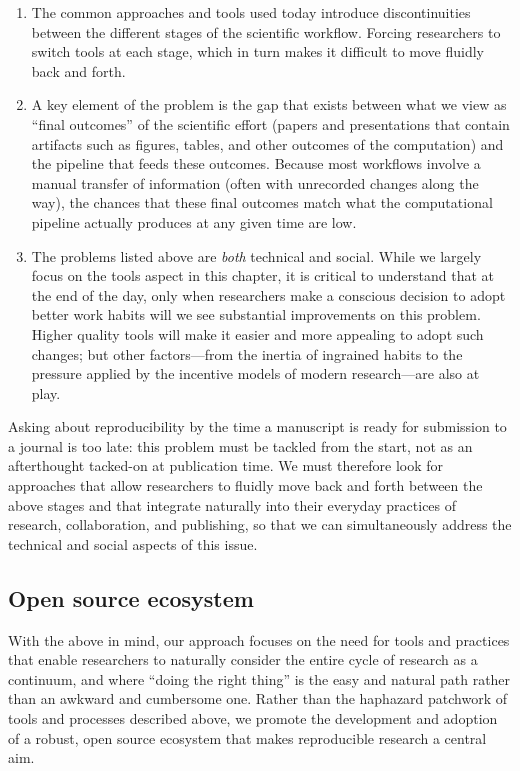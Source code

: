 \documentclass[11pt,oneside,english]{article}
\begin{document}
\begin{enumerate}

\item The common approaches and tools used today introduce discontinuities
  between the different stages of the scientific workflow. Forcing researchers
  to switch tools at each stage, which in turn makes it difficult to move
  fluidly back and forth.

\item A key element of the problem is the gap that exists between what
  we view as ``final outcomes'' of the scientific effort (papers and
  presentations that contain artifacts such as figures, tables, and other
  outcomes of the computation) and the pipeline that feeds these outcomes.
  Because most workflows involve a manual transfer of information (often with
  unrecorded changes along the way), the chances that these final
  outcomes match what the computational pipeline actually produces at any
  given time are low.

\item The problems listed above are \emph{both} technical and social.  While we
  largely focus on the tools aspect in this chapter, it is critical to understand
  that at the end of the day, only when researchers make a conscious decision to
  adopt better work habits will we see substantial improvements on this problem.
  Higher quality tools will make it easier and more appealing to adopt such
  changes; but other factors---from the inertia of ingrained habits to the
  pressure applied by the incentive models of modern research---are also at play.

\end{enumerate}

Asking about reproducibility by the time a manuscript is ready for submission
to a journal is too late: this problem must be tackled from the start, not as
an afterthought tacked-on at publication time.  We must therefore look for
approaches that allow researchers to fluidly move back and forth between the
above stages and that integrate naturally into their everyday practices of
research, collaboration, and publishing, so that we can simultaneously address
the technical and social aspects of this issue.

\subsection{Open source ecosystem}

With the above in mind, our approach focuses on the need for tools and
practices that enable researchers to naturally consider the entire cycle of
research as a continuum, and where ``doing the right thing'' is the easy and
natural path rather than an awkward and cumbersome one.  Rather than the
haphazard patchwork of tools and processes described above, we promote the
development and adoption of a robust, open source ecosystem that makes
reproducible research a central aim.
\end{document}

